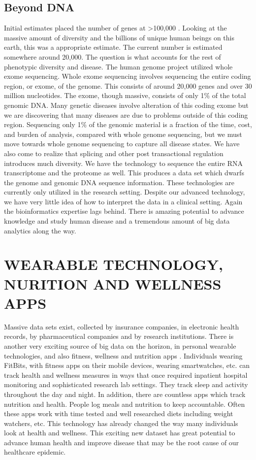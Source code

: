 \documentclass[sigconf]{acmart}
\begin{document}
\subsection{	Beyond DNA}

Initial estimates placed the number of genes at >100,000
\cite{vanderbilt}.  Looking at the massive amount of diversity and the
billions of unique human beings on this earth, this was a appropriate
estimate.  The current number is estimated somewhere around 20,000.
The question is what accounts for the rest of phenotypic diversity and
disease.  The human genome project utilized whole exome sequencing.
Whole exome sequencing involves sequencing the entire coding region,
or exome, of the genome.  This consists of around 20,000 genes and
over 30 million nucleotides.  The exome, though massive, consists of
only 1\% of the total genomic DNA.  Many genetic diseases involve
alteration of this coding exome but we are discovering that many
diseases are due to problems outside of this coding region.
Sequencing only 1\% of the genomic material is a fraction of the time,
cost, and burden of analysis, compared with whole genome sequencing,
but we must move towards whole genome sequencing to capture all
disease states.  We have also come to realize that splicing and other
post transactional regulation introduces much diversity.  We have the
technology to sequence the entire RNA transcriptome and the proteome
as well.  This produces a data set which dwarfs the genome and genomic
DNA sequence information.  These technologies are currently only
utilized in the research setting.  Despite our advanced technology, we
have very little idea of how to interpret the data in a clinical
setting.  Again the bioinformatics expertise lags behind.  There is
amazing potential to advance knowledge and study human disease and a
tremendous amount of big data analytics along the way.

\section{WEARABLE TECHNOLOGY, NURITION AND WELLNESS APPS}

Massive data sets exist, collected by insurance companies, in
electronic health records, by pharmaceutical companies and by research
institutions.  There is another very exciting source of big data on
the horizon, in personal wearable technologies, and also fitness,
wellness and nutrition apps \cite{fox6}.  Individuals wearing FitBits, with
fitness apps on their mobile devices, wearing smartwatches, etc. can
track health and wellness measures in ways that once required
inpatient hospital monitoring and sophisticated research lab settings.
They track sleep and activity throughout the day and night.  In
addition, there are countless apps which track nutrition and health.
People log meals and nutrition to keep accountable.  Often these apps
work with time tested and well researched diets including weight
watchers, etc.  This technology has already changed the way many
individuals look at health and wellness.  This exciting new dataset
has great potential to advance human health and improve disease that
may be the root cause of our healthcare epidemic.
\end{document}
